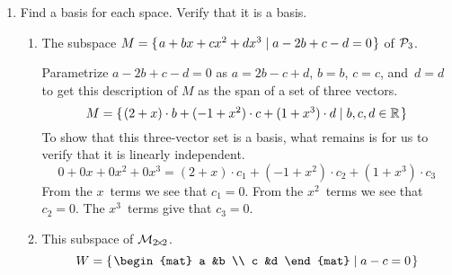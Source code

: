 \documentclass[11pt]{article}
\begin{document}
\thispagestyle{empty}

\begin{enumerate}
\item
Find a basis for each space.
Verify that it is a basis.
  \begin{enumerate}
  \item The subspace $M=\mbox{$\{\hspace{0.1em}a+bx+cx^2+dx^3\mid a-2b+c-d=0\hspace{0.1em}\}$}$ 
   of $\mathcal{P}_3$.

   Parametrize $a-2b+c-d=0$ as $a=2b-c+d$, $b=b$, $c=c$, and~$d=d$ to get
   this description of $M$ as the span of a set of three vectors.
   \begin{equation*}
     M=\mbox{$\{\hspace{0.1em}
      (2+x)\cdot b+(-1+x^2)\cdot c+(1+x^3)\cdot d
      \mid b,c,d\in\mathbb{R}
      \hspace{0.1em}\}$}
   \end{equation*}
   To show that this three-vector set is a basis, what remains is for us to
   verify that it is linearly independent.
   \begin{equation*}
      0+0x+0x^2+0x^3=(2+x)\cdot c_1+(-1+x^2)\cdot c_2+(1+x^3)\cdot c_3
   \end{equation*}
   From the $x$~terms we see that $c_1=0$.
   From the $x^2$~terms we see that $c_2=0$.
   The $x^3$~terms give that $c_3=0$. 

  \item This subspace of $\mathcal{M}_{2 \! \times \! 2}$.
    \begin{equation*}
      W=\set{
        \begin{mat}
          a  &b  \\
          c  &d
        \end{mat}
        \suchthat a-c=0}
    \end{equation*}


\end{enumerate}
\end{enumerate}
\end{document}
